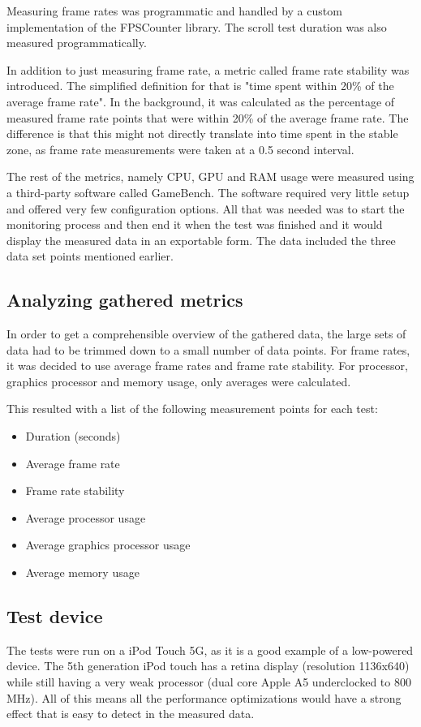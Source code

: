 \documentclass[a4paper,12pt]{article}
\begin{document}
Measuring frame rates was programmatic and handled by a custom implementation of the FPSCounter\cite{FPSCounterGithub} library. The scroll test duration was also measured programmatically.

In addition to just measuring frame rate, a metric called frame rate stability was introduced. The simplified definition for that is "time spent within 20\% of the average frame rate". In the background, it was calculated as the percentage of measured frame rate points that were within 20\% of the average frame rate. The difference is that this might not directly translate into time spent in the stable zone, as frame rate measurements were taken at a 0.5 second interval.

The rest of the metrics, namely CPU, GPU and RAM usage were measured using a third-party software called GameBench\cite{GameBenchHome}. The software required very little setup and offered very few configuration options. All that was needed was to start the monitoring process and then end it when the test was finished and it would display the measured data in an exportable form. The data included the three data set points mentioned earlier.

\subsection{Analyzing gathered metrics}
In order to get a comprehensible overview of the gathered data, the large sets of data had to be trimmed down to a small number of data points. For frame rates, it was decided to use average frame rates and frame rate stability. For processor, graphics processor and memory usage, only averages were calculated.

This resulted with a list of the following measurement points for each test:
\begin{itemize}
  \item Duration (seconds)
  \item Average frame rate
  \item Frame rate stability
  \item Average processor usage
  \item Average graphics processor usage
  \item Average memory usage
\end{itemize}

\subsection{Test device}
The tests were run on a iPod Touch 5G, as it is a good example of a low-powered device. The 5th generation iPod touch has a retina display (resolution 1136x640)\cite{AppleIPodTouch5G} while still having a very weak processor (dual core Apple A5 underclocked to 800 MHz)\cite{MacObserverUnderclock}. All of this means all the performance optimizations would have a strong effect that is easy to detect in the measured data.
\end{document}
